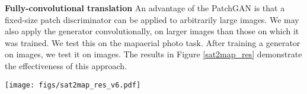 \documentclass[10pt,twocolumn,letterpaper]{article}
\begin{document}
{\bf Fully-convolutional translation} An advantage of the PatchGAN is that a fixed-size patch discriminator can be applied to arbitrarily large images. We may also apply the generator convolutionally, on larger images than those on which it was trained. We test this on the mapaerial photo task. After training a generator on  images, we test it on  images. The results in Figure \ref{sat2map_res} demonstrate the effectiveness of this approach.




\begin{figure*}[t]
 \centering
 \texttt{[image: figs/sat2map\_res\_v6.pdf]}
 \vspace{-0.2in}
  \caption{Example results on Google Maps at 512x512 resolution (model was trained on images at  resolution, and run convolutionally on the larger images at test time). Contrast adjusted for clarity.}
 \label{sat2map_res}
 \vspace{-0.2in}
\end{figure*}
\end{document}
